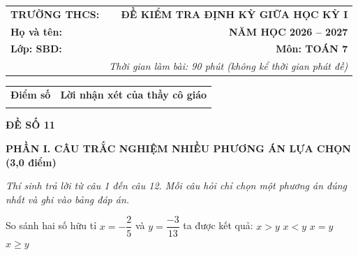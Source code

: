 \documentclass[12pt,a4paper]{article}
\begin{document}
\noindent
\begin{tabularx}{\linewidth}{X r}
\textbf{TRƯỜNG THCS: \dotfill} & \textbf{ĐỀ KIỂM TRA ĐỊNH KỲ GIỮA HỌC KỲ I} \\
\textbf{Họ và tên: \dotfill} & \textbf{NĂM HỌC 2026 -- 2027} \\
\textbf{Lớp: \dotfill \quad SBD: \dotfill} & \textbf{Môn: TOÁN 7} \\
& \textit{Thời gian làm bài: 90 phút (không kể thời gian phát đề)}
\end{tabularx}

\vspace{1mm}
\noindent
\begin{tabularx}{\linewidth}{|p{3.5cm}|X|}
\hline
\centering\textbf{Điểm số} & \centering\textbf{Lời nhận xét của thầy cô giáo} \tabularnewline
\rule{0pt}{0.8cm} & \\
\hline
\end{tabularx}

\vspace{1.5mm}
\begin{center}
\textbf{\large ĐỀ SỐ 11}
\end{center}

\noindent\textbf{\large PHẦN I. CÂU TRẮC NGHIỆM NHIỀU PHƯƠNG ÁN LỰA CHỌN (3,0 điểm)}

\textit{Thí sinh trả lời từ câu 1 đến câu 12. Mỗi câu hỏi chỉ chọn một phương án đúng nhất và ghi vào bảng đáp án.}

\vspace{1mm}
\begin{ex}
So sánh hai số hữu tỉ $x = -\dfrac{2}{5}$ và $y = \dfrac{-3}{13}$ ta được kết quả:
\choice
{$x > y$}
{\True $x < y$}
{$x = y$}
{$x \ge y$}
\end{ex}
\end{document}
